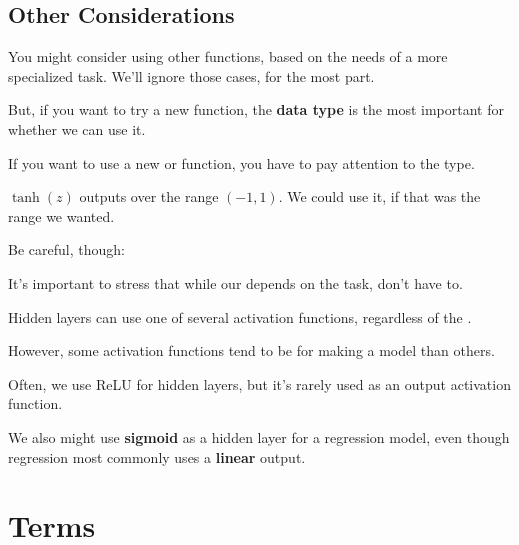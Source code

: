     \subsecdiv{}

    \subsection{Other Considerations}
    
        You might consider using other functions, based on the needs of a more specialized task. We'll ignore those cases, for the most part.
        
        But, if you want to try a new function, the \textbf{data type} is the most important for whether we can use it.\\
    
        \begin{concept}
            If you want to use a new  or  function, you have to pay attention to the  type.
        \end{concept}
    
        \miniex $\tanh(z)$ outputs over the range $(-1, 1)$. We could use it, if that was the range we wanted.
    
        Be careful, though:\\
    
        \begin{clarification}
            It's important to stress that while our  depends on the task,  don't have to.
    
            Hidden layers can use one of several  activation functions, regardless of the .

            However, some activation functions tend to be  for making a model than others.
        \end{clarification}
    
        \miniex Often, we use ReLU for hidden layers, but it's rarely used as an output activation function. 
        
        We also might use \textbf{sigmoid} as a hidden layer for a regression model, even though regression most commonly uses a \textbf{linear} output.

    
    
\pagebreak

\section*{Terms}

